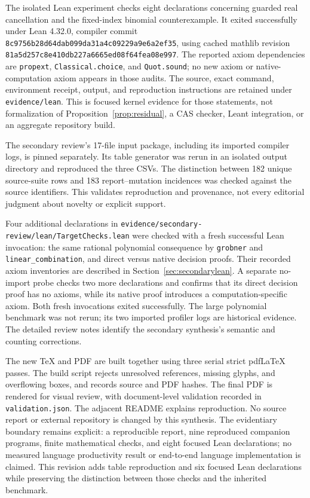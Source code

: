 \documentclass[11pt,letterpaper]{article}
\newcommand{\code}[1]{\nolinkurl{#1}}
\begin{document}
The isolated Lean experiment checks eight declarations concerning guarded real
cancellation and the fixed-index binomial counterexample. It exited successfully
under Lean 4.32.0, compiler commit
\code{8c9756b28d64dab099da31a4c09229a9e6a2ef35}, using cached mathlib revision
\code{81a5d257c8e410db227a6665ed08f64fea08e997}. The reported axiom dependencies
are \texttt{propext}, \texttt{Classical.choice}, and \texttt{Quot.sound}; no new
axiom or native-computation axiom appears in those audits. The source, exact
command, environment receipt, output, and reproduction instructions are retained
under \code{evidence/lean}. This is focused kernel evidence for those statements,
not formalization of Proposition~\ref{prop:residual}, a CAS checker, Leant
integration, or an aggregate repository build.

The secondary review's 17-file input package, including its imported compiler
logs, is pinned separately. Its table generator was rerun in an isolated output
directory and reproduced the three CSVs. The distinction between 182 unique
source-suite rows and 183 report--mutation incidences was checked against the
source identifiers. This validates reproduction and provenance, not every
editorial judgment about novelty or explicit support.

Four additional declarations in \code{evidence/secondary-review/lean/TargetChecks.lean}
were checked with a fresh successful Lean invocation: the same rational
polynomial consequence by \texttt{grobner} and \texttt{linear\_combination}, and
direct versus native decision proofs. Their recorded axiom inventories are
described in Section~\ref{sec:secondarylean}. A separate no-import probe checks
two more declarations and confirms that its direct decision proof has no axioms,
while its native proof introduces a computation-specific axiom. Both fresh
invocations exited successfully. The large polynomial benchmark was not rerun;
its two imported profiler logs are historical evidence. The detailed
review notes identify the secondary synthesis's semantic and counting corrections.

The new TeX and PDF are built together using three serial strict pdfLaTeX passes.
The build script rejects unresolved references, missing glyphs, and overflowing
boxes, and records source and PDF hashes. The final PDF is rendered for visual
review, with document-level validation recorded in \code{validation.json}.
The adjacent README explains reproduction. No source report or external
repository is changed by this synthesis. The evidentiary boundary remains
explicit: a reproducible report, nine reproduced companion programs, finite
mathematical checks, and eight focused Lean declarations; no measured language
productivity result or end-to-end language implementation is claimed. This
revision adds table reproduction and six focused Lean declarations while
preserving the distinction between those checks and the inherited benchmark.
\end{document}
